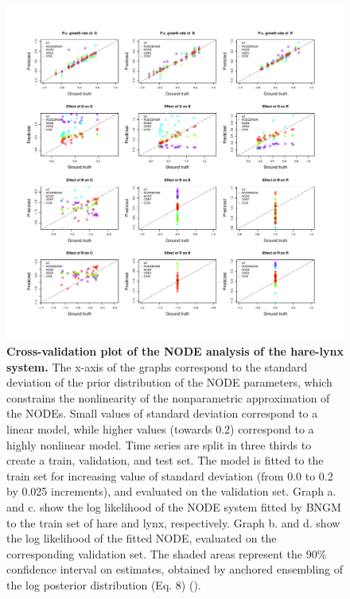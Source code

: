 \documentclass[11pt, oneside]{article}
\begin{document}
\newpage
\begin{figure}[H]
\includegraphics[width=1\linewidth,page=16]{figures/figures_supplementary.pdf}
\caption{
    \textbf{Cross-validation plot of the NODE analysis of the hare-lynx system.}
    The x-axis of the graphs correspond to the standard deviation of the prior distribution of the NODE parameters, which constrains the nonlinearity of the nonparametric approximation of the NODEs.
    Small values of standard deviation correspond to a linear model, while higher values (towards 0.2) correspond to a highly nonlinear model.
    Time series are split in three thirds to create a train, validation, and test set. 
    The model is fitted to the train set for increasing value of standard deviation (from 0.0 to 0.2 by 0.025 increments), and evaluated on the validation set.
    Graph a. and c. show the log likelihood of the NODE system fitted by BNGM to the train set of hare and lynx, respectively.
    Graph b. and d. show the log likelihood of the fitted NODE, evaluated on the corresponding validation set.
    The shaded areas represent the 90\% confidence interval on estimates, obtained by anchored ensembling of the log posterior distribution (Eq. 8) (\cite{Pearce2018}).
}
\end{figure}
\newpage
\end{document}

